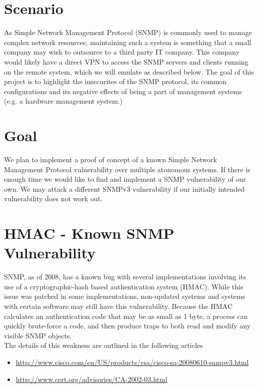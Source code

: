 \documentclass[pdftex, 11pt]{article}
\begin{document}


\pagebreak

\setcounter{secnumdepth}{2}

\section{Scenario}
As Simple Network Management Protocol (SNMP) is commonly used to manage complex 
network resources, maintaining such a system is something that a small company 
may wish to outsource to a third party IT company.  This company would likely 
have a direct VPN to access the SNMP servers and clients running on the remote 
system, which we  will emulate as described below. The goal of this project 
is to highlight the insecurites of the SNMP protocol, its common configurations 
and its negative effects of being a part of management systems 
(e.g. a hardware management system.)

\section{Goal}
We plan to implement a proof of concept of a known Simple Network Management 
Protocol vulnerability over multiple atonomous systems. If there is enough time
we would like to find and implement a SNMP vulnerability of our own. We may attack
a different SNMPv3 vulnerability if our initially intended vulnerability does not work out.

\section{HMAC - Known SNMP Vulnerability}
SNMP, as of 2008, has a known bug with several implementations involving its use 
of a cryptographic-hash based authentication system (HMAC).  While this issue was 
patched in some implementations, non-updated systems and systems with certain 
software may still have this vulnerability.  Because the HMAC calculates an 
authentication code that may be as small as 1 byte, a process can quickly 
brute-force a code, and then produce traps to both read and modify any visible 
SNMP objects.
\\

\noindent The details of this weakness are outlined in the following articles
\begin{itemize}
\item \url{http://www.cisco.com/en/US/products/csa/cisco-sa-20080610-snmpv3.html}
\item \url{http://www.cert.org/advisories/CA-2002-03.html}
\end{itemize}
\end{document}
